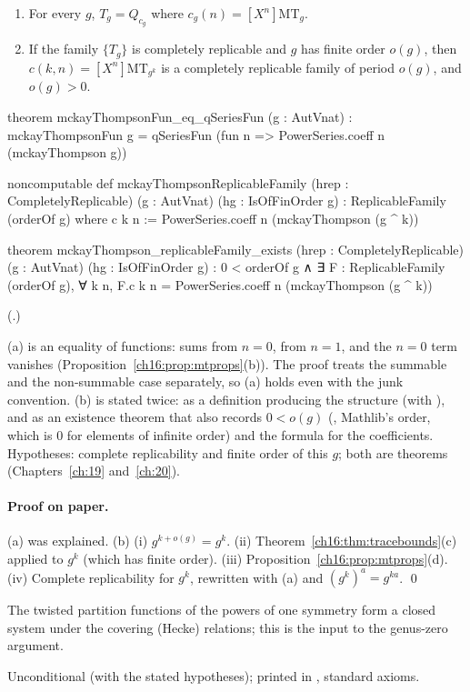 \begin{proposition}\label{ch16:prop:mtfamily}
\begin{enumerate}[label=(\alph*)]
\item For every $g$, $T_g=Q_{c_g}$ where $c_g(n)=[X^n]\mathrm{MT}_g$.
\item If the family $\{T_g\}$ is completely replicable and $g$ has finite order $o(g)$, then
  $c(k,n)=[X^n]\mathrm{MT}_{g^k}$ is a completely replicable family of period $o(g)$, and $o(g)>0$.
\end{enumerate}
\end{proposition}
\begin{leancode}
theorem mckayThompsonFun_eq_qSeriesFun (g : AutVnat) :
    mckayThompsonFun g = qSeriesFun (fun n => PowerSeries.coeff n (mckayThompson g))

noncomputable def mckayThompsonReplicableFamily (hrep : CompletelyReplicable)
    (g : AutVnat) (hg : IsOfFinOrder g) : ReplicableFamily (orderOf g) where
  c k n := PowerSeries.coeff n (mckayThompson (g ^ k))

theorem mckayThompson_replicableFamily_exists (hrep : CompletelyReplicable)
    (g : AutVnat) (hg : IsOfFinOrder g) :
    0 < orderOf g ∧ ∃ F : ReplicableFamily (orderOf g),
      ∀ k n, F.c k n = PowerSeries.coeff n (mckayThompson (g ^ k))
\end{leancode}
(.)
\begin{dictionary}
(a) is an equality of functions:  sums from $n=0$,  from $n=1$, and the $n=0$
term vanishes (Proposition~\ref{ch16:prop:mtprops}(b)).  The proof treats the summable and the non-summable case
separately, so (a) holds even with the  junk convention.  (b) is stated twice: as a definition producing the
structure (with ), and as an existence theorem that also
records $0<o(g)$ (, Mathlib's order, which is $0$ for elements of infinite order) and the formula for
the coefficients.  Hypotheses: complete replicability and finite order of this $g$; both are theorems (Chapters~\ref{ch:19}
and~\ref{ch:20}).
\end{dictionary}
\paragraph{Proof on paper.}  (a) was explained.  (b) (i) $g^{k+o(g)}=g^k$.  (ii) Theorem~\ref{ch16:thm:tracebounds}(c)
applied to $g^k$ (which has finite order).  (iii) Proposition~\ref{ch16:prop:mtprops}(d).  (iv) Complete
replicability for $g^k$, rewritten with (a) and $(g^k)^a=g^{ka}$. \qed
\begin{physics}
The twisted partition functions of the powers of one symmetry form a closed system under the covering (Hecke)
relations; this is the input to the genus-zero argument.
\end{physics}
\begin{status}
Unconditional (with the stated hypotheses); printed in , standard
axioms.
\end{status}

